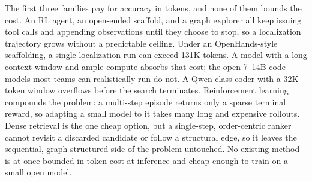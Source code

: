 The first three families pay for accuracy in tokens, and none of
them bounds the cost. An RL agent, an open-ended scaffold, and a
graph explorer all keep issuing tool calls and appending
observations until they choose to stop, so a localization
trajectory grows without a predictable ceiling. Under an
OpenHands-style scaffolding, a single localization run can
exceed 131K tokens. A model with a
long context window and ample compute absorbs that cost; the
open 7--14B code models most teams can realistically run do not.
A Qwen-class coder with a 32K-token window overflows before the
search terminates. Reinforcement learning compounds the problem:
a multi-step episode returns only a sparse terminal reward, so
adapting a small model to it takes many long and expensive
rollouts. Dense retrieval is the one cheap option, but a
single-step, order-centric ranker cannot revisit a discarded
candidate or follow a structural edge, so it leaves the
sequential, graph-structured side of the problem untouched. No
existing method is at once bounded in token cost at inference
and cheap enough to train on a small open model.

